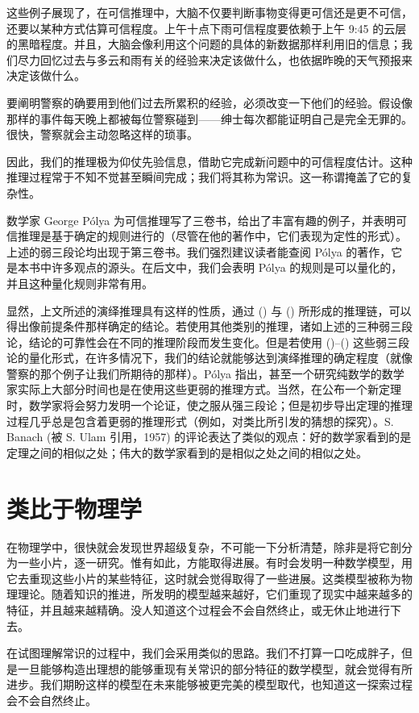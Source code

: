 这些例子展现了，在可信推理中，大脑不仅要判断事物变得更可信还是更不可信，还要以某种方式估算可信程度。上午十点下雨可信程度要依赖于上午 9:45 的云层的黑暗程度。并且，大脑会像利用这个问题的具体的新数据那样利用旧的信息；我们尽力回忆过去与多云和雨有关的经验来决定该做什么，也依据昨晚的天气预报来决定该做什么。

要阐明警察的确要用到他们过去所累积的经验，必须改变一下他们的经验。假设像那样的事件每天晚上都被每位警察碰到——绅士每次都能证明自己是完全无罪的。很快，警察就会主动忽略这样的琐事。

因此，我们的推理极为仰仗先验信息，借助它完成新问题中的可信程度估计。这种推理过程常于不知不觉甚至瞬间完成；我们将其称为常识。这一称谓掩盖了它的复杂性。

数学家 George Pólya 为可信推理写了三卷书，给出了丰富有趣的例子，并表明可信推理是基于确定的规则进行的（尽管在他的著作中，它们表现为定性的形式）。上述的弱三段论均出现于第三卷书。我们强烈建议读者能查阅 Pólya 的著作，它是本书中许多观点的源头。在后文中，我们会表明 Pólya 的规则是可以量化的，并且这种量化规则非常有用。

显然，上文所述的演绎推理具有这样的性质，通过 (\in[syllogism-1]) 与 (\in[syllogism-2]) 所形成的推理链，可以得出像前提条件那样确定的结论。若使用其他类别的推理，诸如上述的三种弱三段论，结论的可靠性会在不同的推理阶段而发生变化。但是若使用 (\in[weak-1])--(\in[weak-3]) 这些弱三段论的量化形式，在许多情况下，我们的结论就能够达到演绎推理的确定程度（就像警察的那个例子让我们所期待的那样）。Pólya 指出，甚至一个研究纯数学的数学家实际上大部分时间也是在使用这些更弱的推理方式。当然，在公布一个新定理时，数学家将会努力发明一个论证，使之服从强三段论；但是初步导出定理的推理过程几乎总是包含着更弱的推理形式（例如，对类比所引发的猜想的探究）。S. Banach (被 S. Ulam 引用，1957) 的评论表达了类似的观点：好的数学家看到的是定理之间的相似之处；伟大的数学家看到的是相似之处之间的相似之处。

\section{类比于物理学}

在物理学中，很快就会发现世界超级复杂，不可能一下分析清楚，除非是将它剖分为一些小片，逐一研究。惟有如此，方能取得进展。有时会发明一种数学模型，用它去重现这些小片的某些特征，这时就会觉得取得了一些进展。这类模型被称为物理理论。随着知识的推进，所发明的模型越来越好，它们重现了现实中越来越多的特征，并且越来越精确。没人知道这个过程会不会自然终止，或无休止地进行下去。

在试图理解常识的过程中，我们会采用类似的思路。我们不打算一口吃成胖子，但是一旦能够构造出理想的能够重现有关常识的部分特征的数学模型，就会觉得有所进步。我们期盼这样的模型在未来能够被更完美的模型取代，也知道这一探索过程会不会自然终止。

